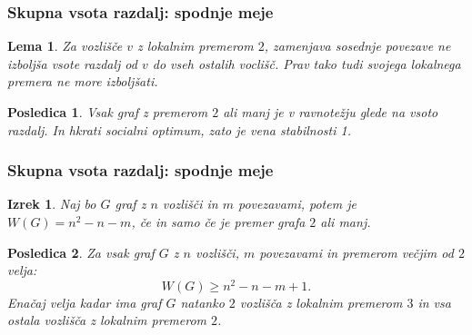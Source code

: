 \documentclass[12pt, hyperref={unicode}]{beamer}
\newtheorem{izrek}{Izrek}
\newtheorem{posledica}{Posledica}
\newtheorem{lema}{Lema}
\begin{document}
\begin{frame}
  
  \frametitle{Skupna vsota razdalj: spodnje meje}
  \begin{lema}
    Za vozlišče $v$ z lokalnim premerom $2$, zamenjava sosednje povezave ne izboljša
    vsote razdalj od $v$ do vseh ostalih voclišč. Prav tako tudi svojega lokalnega premera ne more izboljšati.
  \end{lema}
  \begin{posledica}
    Vsak graf z premerom $2$ ali manj je v \textit{ravnotežju glede na vsoto razdalj}.
    In hkrati socialni optimum, zato je vena stabilnosti 1.
  \end{posledica}
  
\end{frame}


\begin{frame}
  
  \frametitle{Skupna vsota razdalj: spodnje meje}
  \begin{izrek}
    Naj bo $G$ graf z $n$ vozlišči in $m$ povezavami, potem je $W(G) = n^2 - n - m$, če in samo če je premer grafa $2$ ali manj.
  \end{izrek}
  \begin{posledica}
    Za vsak graf $G$ z $n$ vozlišči, $m$ povezavami in premerom večjim od $2$ velja:
    $$W(G) \geq n^2 - n - m + 1.$$
    Enačaj velja kadar ima graf $G$ natanko $2$ vozlišča z lokalnim premerom $3$ in vsa ostala vozlišča z lokalnim premerom $2$.
  \end{posledica}
  
\end{frame}

\end{document}
